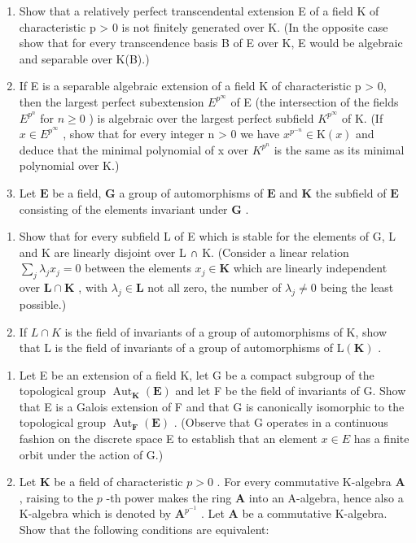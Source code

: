 \begin{enumerate}
\def\labelenumi{\arabic{enumi})}
\setcounter{enumi}{6}
\item
  Show that a relatively perfect transcendental extension E of a field K of characteristic p \textgreater{} 0 is not finitely generated over K. (In the opposite case show that for every transcendence basis B of E over K, E would be algebraic and separable over K(B).)
\item
  If E is a separable algebraic extension of a field K of characteristic p \textgreater{} 0, then the largest perfect subextension \(E^{p^{\infty}}\) of E (the intersection of the fields \(E^{p^{n}}\) for \(n \geqslant 0\) ) is algebraic over the largest perfect subfield \(K^{p^{\infty}}\) of K. (If \(x \in E^{p^{\infty}}\) , show that for every integer n \textgreater{} 0 we have \(x^{p^{-n}} \in \mathrm{K}(x)\) and deduce that the minimal polynomial of x over \(K^{p^{n}}\) is the same as its minimal polynomial over K.)
\item
  Let \(\mathbf{E}\) be a field, \(\mathbf{G}\) a group of automorphisms of \(\mathbf{E}\) and \(\mathbf{K}\) the subfield of \(\mathbf{E}\) consisting of the elements invariant under \(\mathbf{G}\) .
\end{enumerate}

\begin{enumerate}
\def\labelenumi{\alph{enumi})}
\item
  Show that for every subfield L of E which is stable for the elements of G, L and K are linearly disjoint over L ∩ K. (Consider a linear relation \(\sum_{j}\lambda_{j}x_{j}=0\) between the elements \(x_{j} \in \mathbf{K}\) which are linearly independent over \(\mathbf{L} \cap \mathbf{K}\) , with \(\lambda_{j} \in \mathbf{L}\) not all zero, the number of \(\lambda_{j} \neq 0\) being the least possible.)
\item
  If \(L \cap K\) is the field of invariants of a group of automorphisms of K, show that L is the field of invariants of a group of automorphisms of \(\mathrm{L}(\mathbf{K})\) .
\end{enumerate}

\begin{enumerate}
\def\labelenumi{\arabic{enumi})}
\setcounter{enumi}{9}
\item
  Let E be an extension of a field K, let G be a compact subgroup of the topological group \(\operatorname{Aut}_{\mathbf{K}}(\mathbf{E})\) and let F be the field of invariants of G. Show that E is a Galois extension of F and that G is canonically isomorphic to the topological group \(\operatorname{Aut}_{\mathbf{F}}(\mathbf{E})\) . (Observe that G operates in a continuous fashion on the discrete space E to establish that an element \(x \in E\) has a finite orbit under the action of G.)
\item
  Let \(\mathbf{K}\) be a field of characteristic \(p > 0\) . For every commutative K-algebra \(\mathbf{A}\) , raising to the \(p\) -th power makes the ring \(\mathbf{A}\) into an A-algebra, hence also a K-algebra which is denoted by \(\mathbf{A}^{p^{-1}}\) . Let \(\mathbf{A}\) be a commutative K-algebra. Show that the following conditions are equivalent:
\end{enumerate}

